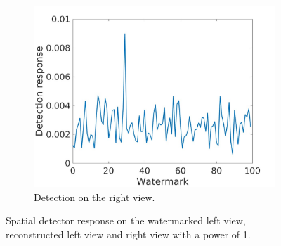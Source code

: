 \begin{figure}[h!]
\begin{subfigure}[t]{0.5\textwidth}
\end{subfigure}
\begin{subfigure}[t]{0.5\textwidth}
\centering
\includegraphics[width=1\textwidth]{./img/corr_gauss/right_warped_corr_value_1.jpg}
   \caption{\small{Detection on the right view.}\label{fig:gr1}}
\end{subfigure}
\caption{Spatial detector response on the watermarked left view, reconstructed left view and right view with a power of 1.\label{fig:gauss11}}
\end{figure}

